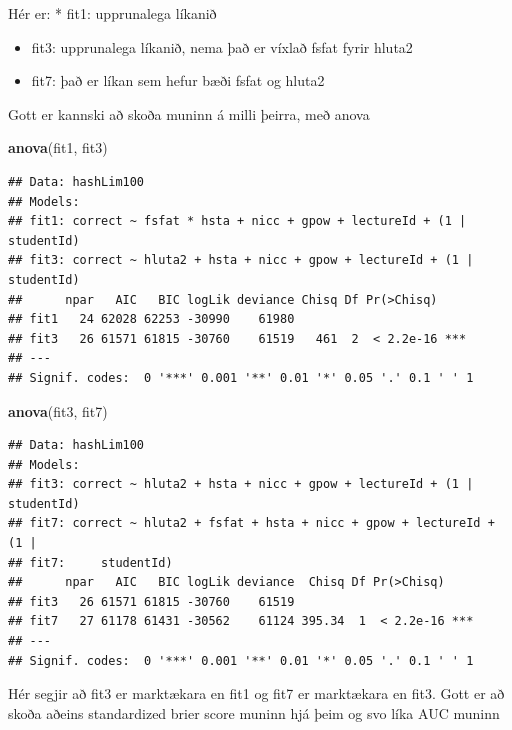 \documentclass[
]{article}
\newenvironment{Shaded}{\begin{snugshade}}{\end{snugshade}}
\newcommand{\KeywordTok}[1]{\textcolor[rgb]{0.13,0.29,0.53}{\textbf{#1}}}
\newcommand{\NormalTok}[1]{#1}
\begin{document}
Hér er:
* fit1: upprunalega líkanið

\begin{itemize}
\item
  fit3: upprunalega líkanið, nema það er víxlað fsfat fyrir hluta2
\item
  fit7: það er líkan sem hefur bæði fsfat og hluta2
\end{itemize}

Gott er kannski að skoða muninn á milli þeirra, með anova

\begin{Shaded}
\begin{Highlighting}[]
\KeywordTok{anova}\NormalTok{(fit1, fit3)}
\end{Highlighting}
\end{Shaded}

\begin{verbatim}
## Data: hashLim100
## Models:
## fit1: correct ~ fsfat * hsta + nicc + gpow + lectureId + (1 | studentId)
## fit3: correct ~ hluta2 + hsta + nicc + gpow + lectureId + (1 | studentId)
##      npar   AIC   BIC logLik deviance Chisq Df Pr(>Chisq)    
## fit1   24 62028 62253 -30990    61980                        
## fit3   26 61571 61815 -30760    61519   461  2  < 2.2e-16 ***
## ---
## Signif. codes:  0 '***' 0.001 '**' 0.01 '*' 0.05 '.' 0.1 ' ' 1
\end{verbatim}

\begin{Shaded}
\begin{Highlighting}[]
\KeywordTok{anova}\NormalTok{(fit3, fit7)}
\end{Highlighting}
\end{Shaded}

\begin{verbatim}
## Data: hashLim100
## Models:
## fit3: correct ~ hluta2 + hsta + nicc + gpow + lectureId + (1 | studentId)
## fit7: correct ~ hluta2 + fsfat + hsta + nicc + gpow + lectureId + (1 | 
## fit7:     studentId)
##      npar   AIC   BIC logLik deviance  Chisq Df Pr(>Chisq)    
## fit3   26 61571 61815 -30760    61519                         
## fit7   27 61178 61431 -30562    61124 395.34  1  < 2.2e-16 ***
## ---
## Signif. codes:  0 '***' 0.001 '**' 0.01 '*' 0.05 '.' 0.1 ' ' 1
\end{verbatim}

Hér segjir að fit3 er marktækara en fit1 og fit7 er marktækara en fit3.
Gott er að skoða aðeins standardized brier score muninn hjá þeim og svo líka AUC muninn
\end{document}
